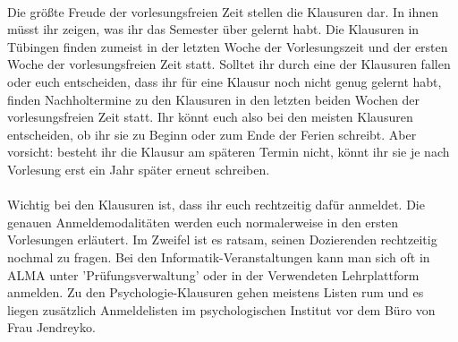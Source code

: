  \\
Die größte Freude der vorlesungsfreien Zeit stellen die Klausuren dar. In ihnen müsst ihr zeigen, was ihr das Semester über gelernt habt. Die Klausuren in Tübingen finden zumeist in der letzten Woche der Vorlesungszeit und der ersten Woche der vorlesungsfreien Zeit statt. Solltet ihr durch eine der Klausuren fallen oder euch entscheiden, dass ihr für eine Klausur noch nicht genug gelernt habt, finden Nachholtermine zu den Klausuren in den letzten beiden Wochen der vorlesungsfreien Zeit statt. Ihr könnt euch also bei den meisten Klausuren entscheiden, ob ihr sie zu Beginn oder zum Ende der Ferien schreibt. Aber vorsicht: besteht ihr die Klausur am späteren Termin nicht, könnt ihr sie je nach Vorlesung erst ein Jahr später erneut schreiben.\\
\\
Wichtig bei den Klausuren ist, dass ihr euch rechtzeitig dafür anmeldet. Die genauen Anmeldemodalitäten werden euch normalerweise in den ersten Vorlesungen erläutert. Im Zweifel ist es ratsam, seinen Dozierenden rechtzeitig nochmal zu fragen. Bei den Informatik-Veranstaltungen kann man sich oft in ALMA unter 'Prüfungsverwaltung' oder in der Verwendeten Lehrplattform anmelden. Zu den Psychologie-Klausuren gehen meistens Listen rum und es liegen zusätzlich Anmeldelisten im psychologischen Institut vor dem Büro von Frau Jendreyko.
